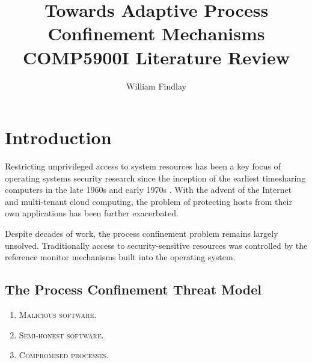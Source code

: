 \documentclass[dvipsnames, 12pt]{article}
\title{\huge Towards Adaptive Process Confinement
Mechanisms\\{\large COMP5900I Literature Review}}
\author{William Findlay}
\begin{document}
\maketitle
\thispagestyle{plain}


\setcounter{page}{1}

\begin{abstract}
\end{abstract}

\onehalfspacing

\section{Introduction}

Restricting unprivileged access to system resources has been a key focus of
operating systems security research since the inception of the earliest
timesharing computers in the late 1960s and early 1970s
\cite{lampson_1973_a_note, graham_1968_protection}. With the advent of the
Internet and multi-tenant cloud computing, the problem of protecting hosts from
their own applications has been further exacerbated.

Despite decades of work, the process confinement problem remains largely
unsolved. Traditionally access to security-sensitive resources was controlled by
the reference monitor mechanisms built into the operating system.

\subsection{The Process Confinement Threat Model}

\begin{enumerate}[label=\bfseries T\arabic*.]
    \item \textsc{Malicious software.}

    \item \textsc{Semi-honest software.}

    \item \textsc{Compromised processes.}
\end{enumerate}
\end{document}
